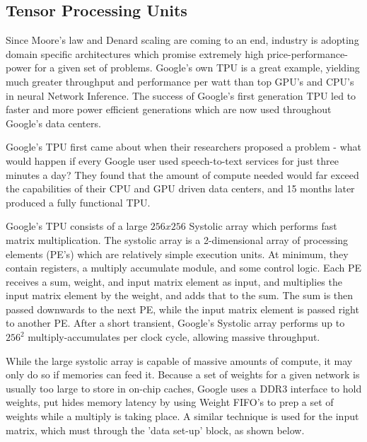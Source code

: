 \documentclass[11pt, conference, onecolumn]{IEEEtran}
\begin{document}
\subsection{Tensor Processing Units}
    Since Moore's law and Denard scaling are coming to an end, industry is adopting
    domain specific architectures which promise extremely high price-performance-power for
    a given set of problems. Google's own TPU is a great example, yielding much greater
    throughput and performance per watt than top GPU's and CPU's in neural Network
    Inference. The success of Google's first generation TPU led to faster and more power
    efficient generations which are now used throughout Google's data centers.

    Google's TPU first came about when their researchers proposed a problem - what
    would happen if every Google user used speech-to-text services for just three minutes
    a day? They found that the amount of compute needed would far exceed the capabilities
    of their CPU and GPU driven data centers, and 15 months later produced a fully
    functional TPU.

    Google's TPU consists of a large $256 x 256$ Systolic array which performs fast matrix
    multiplication. The systolic array is a 2-dimensional array of processing elements
    (PE's) which are relatively simple execution units. At minimum, they contain
    registers, a multiply accumulate module, and some control logic. Each PE receives a
    sum, weight, and input matrix element as input, and multiplies the input matrix
    element by the weight, and adds that to the sum. The sum is then passed downwards
    to the next PE, while the input matrix element is passed right to another PE. After
    a short transient, Google's Systolic array performs up to $256^2$ multiply-accumulates
    per clock cycle, allowing massive throughput.

    While the large systolic array is capable of massive amounts of compute, it may only
    do so if memories can feed it. Because a set of weights for a given network is usually
    too large to store in on-chip caches, Google uses a DDR3 interface to hold weights,
    put hides memory latency by using Weight FIFO's to prep a set of weights while a
    multiply is taking place. A similar technique is used for the input matrix, which must
    through the 'data set-up' block, as shown below.
\end{document}
